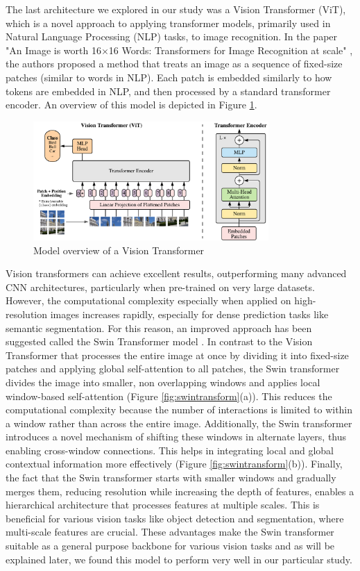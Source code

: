 \documentclass[a4paper,11pt]{article}
\begin{document}
The last architecture we explored in our study was a Vision Transformer (ViT), which is a novel approach to applying transformer models, primarily used in Natural Language Processing (NLP) tasks, to image recognition. In the paper "An Image is worth 16$\times$16 Words: Transformers for Image Recognition at scale" \cite{DBLP:journals/corr/abs-2010-11929}, the authors proposed a method that treats an image as a sequence of fixed-size patches (similar to words in NLP). Each patch is embedded similarly to how tokens are embedded in NLP, and then processed by a standard transformer encoder. An overview of this model is depicted in Figure \ref{fig:vit-arch}.

\begin{figure}[H]
    \centering 
    \includegraphics[width=0.8\textwidth]{model_scheme.pdf}
    \caption{Model overview of a Vision Transformer \cite{DBLP:journals/corr/RonnebergerFB15}}
    \label{fig:vit-arch}
\end{figure}

Vision transformers can achieve excellent results, outperforming many advanced CNN architectures, particularly when pre-trained on very large datasets. However, the computational complexity especially when applied on high-resolution images increases rapidly, especially for dense prediction tasks like semantic segmentation. For this reason, an improved approach has been suggested called the Swin Transformer model \cite{DBLP:journals/corr/abs-2103-14030}. In contrast to the Vision Transformer that processes the entire image at once by dividing it into fixed-size patches and applying global self-attention to all patches, the Swin transformer divides the image into smaller, non overlapping windows and applies local window-based self-attention (Figure \ref{fig:swintransform}(a)). This reduces the computational complexity because the number of interactions is limited to within a window rather than across the entire image. Additionally, the Swin transformer introduces a novel mechanism of shifting these windows in alternate layers, thus enabling cross-window connections. This helps in integrating local and global contextual information more effectively (Figure \ref{fig:swintransform}(b)). Finally, the fact that the Swin transformer starts with smaller windows and gradually merges them, reducing resolution while increasing the depth of features, enables a hierarchical architecture that processes features at multiple scales. This is beneficial for various vision tasks like object detection and segmentation, where multi-scale features are crucial. These advantages make the Swin transformer suitable as a general purpose backbone for various vision tasks and as will be explained later, we found this model to perform very well in our particular study.
\end{document}
